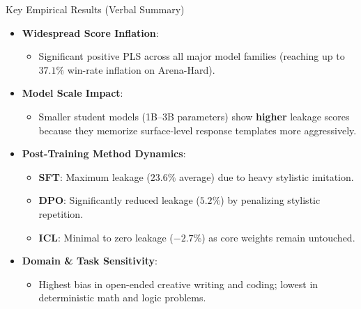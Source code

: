 \documentclass[10pt]{beamer}
\begin{document}
	\begin{frame}{Key Empirical Results (Verbal Summary)}
		\begin{itemize}
			\item \textbf{Widespread Score Inflation}:
			\begin{itemize}
				\item Significant positive PLS across all major model families (reaching up to $37.1\%$ win-rate inflation on Arena-Hard).
			\end{itemize}
			\vspace{0.2cm}
			\item \textbf{Model Scale Impact}:
			\begin{itemize}
				\item Smaller student models (1B--3B parameters) show \textbf{higher} leakage scores because they memorize surface-level response templates more aggressively.
			\end{itemize}
			\vspace{0.2cm}
			\item \textbf{Post-Training Method Dynamics}:
			\begin{itemize}
				\item \textbf{SFT}: Maximum leakage ($23.6\%$ average) due to heavy stylistic imitation.
				\item \textbf{DPO}: Significantly reduced leakage ($5.2\%$) by penalizing stylistic repetition.
				\item \textbf{ICL}: Minimal to zero leakage ($-2.7\%$) as core weights remain untouched.
			\end{itemize}
			\vspace{0.2cm}
			\item \textbf{Domain \& Task Sensitivity}:
			\begin{itemize}
				\item Highest bias in open-ended creative writing and coding; lowest in deterministic math and logic problems.
			\end{itemize}
		\end{itemize}
	\end{frame}
	
	
\end{document}
